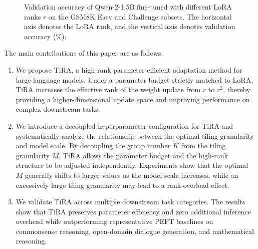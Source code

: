 \documentclass[a4paper,11pt]{article}
\begin{document}
\begin{figure}[H]
    \centering
    \caption{Validation accuracy of Qwen-2-1.5B fine-tuned with different LoRA ranks $r$ on the GSM8K Easy and Challenge subsets. The horizontal axis denotes the LoRA rank, and the vertical axis denotes validation accuracy (\%).}
    \label{fig:rank_motivation}
\end{figure}

The main contributions of this paper are as follows:
\begin{enumerate}[leftmargin=2em]
    \item We propose TiRA, a high-rank parameter-efficient adaptation method for large language models. Under a parameter budget strictly matched to LoRA, TiRA increases the effective rank of the weight update from $r$ to $r^2$, thereby providing a higher-dimensional update space and improving performance on complex downstream tasks.
    \item We introduce a decoupled hyperparameter configuration for TiRA and systematically analyze the relationship between the optimal tiling granularity and model scale. By decoupling the group number $K$ from the tiling granularity $M$, TiRA allows the parameter budget and the high-rank structure to be adjusted independently. Experiments show that the optimal $M$ generally shifts to larger values as the model scale increases, while an excessively large tiling granularity may lead to a rank-overload effect.
    \item We validate TiRA across multiple downstream task categories. The results show that TiRA preserves parameter efficiency and zero additional inference overhead while outperforming representative PEFT baselines on commonsense reasoning, open-domain dialogue generation, and mathematical reasoning.
\end{enumerate}
\end{document}
